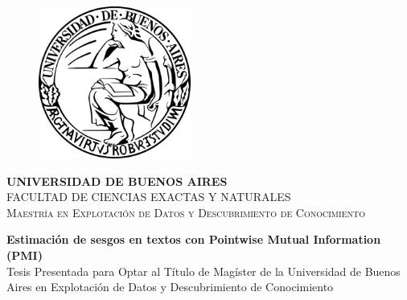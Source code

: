 
\begin{titlepage}



    \begin{figure}[!htb]
        \centering
        \includegraphics[width=5cm]{img/institucional/UBA.svg.png}
    \end{figure}


    \begin{center}
        \Large{\textbf{UNIVERSIDAD DE BUENOS AIRES}}
        \vspace{3mm}
        \\ \normalsize{FACULTAD DE CIENCIAS EXACTAS Y NATURALES}
        \vspace{3mm}
        \\ \normalsize{\textsc{Maestría en Explotación de Datos y Descubrimiento de Conocimiento}}
        \vspace{6mm}
    \end{center}


    \vspace{8mm}
    \begin{center}
        \LARGE{\textbf{Estimación de sesgos en textos con Pointwise Mutual Information (PMI)}}
        \vspace{13mm}
        \\ \normalsize{Tesis Presentada para Optar al Título de Magíster de la Universidad de Buenos Aires en Explotación de Datos y Descubrimiento de Conocimiento}
        \vspace{13mm}
    \end{center}

    \vspace{10mm}


\end{titlepage}
